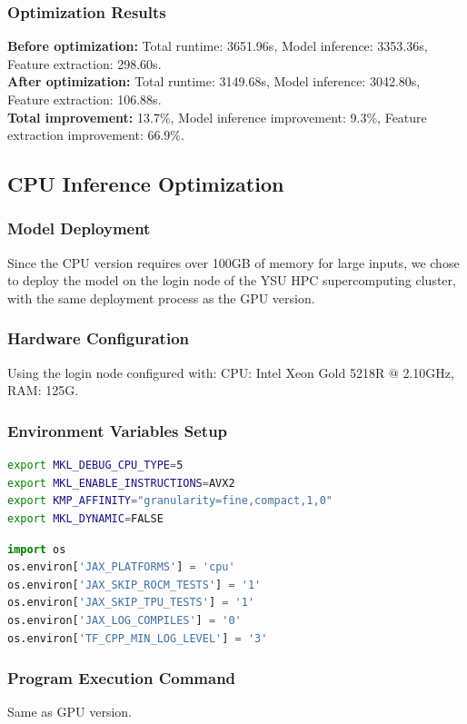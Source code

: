 \documentclass[a4paper,12pt]{article}
\begin{document}
\subsubsection{Optimization Results}
\textbf{Before optimization:} Total runtime: 3651.96s, Model inference: 3353.36s, Feature extraction: 298.60s. \\
\textbf{After optimization:} Total runtime: 3149.68s, Model inference: 3042.80s, Feature extraction: 106.88s. \\
\textbf{Total improvement:} 13.7\%, Model inference improvement: 9.3\%, Feature extraction improvement: 66.9\%.

\subsection{CPU Inference Optimization}

\subsubsection{Model Deployment}
Since the CPU version requires over 100GB of memory for large inputs, we chose to deploy the model on the login node of the YSU HPC supercomputing cluster, with the same deployment process as the GPU version.

\subsubsection{Hardware Configuration}
Using the login node configured with: CPU: Intel Xeon Gold 5218R @ 2.10GHz, RAM: 125G.

\subsubsection{Environment Variables Setup}
\begin{lstlisting}[language=bash]
export MKL_DEBUG_CPU_TYPE=5
export MKL_ENABLE_INSTRUCTIONS=AVX2
export KMP_AFFINITY="granularity=fine,compact,1,0"
export MKL_DYNAMIC=FALSE
\end{lstlisting}
\begin{lstlisting}[language=python]
import os
os.environ['JAX_PLATFORMS'] = 'cpu'
os.environ['JAX_SKIP_ROCM_TESTS'] = '1'
os.environ['JAX_SKIP_TPU_TESTS'] = '1'
os.environ['JAX_LOG_COMPILES'] = '0'
os.environ['TF_CPP_MIN_LOG_LEVEL'] = '3'
\end{lstlisting}

\subsubsection{Program Execution Command}
Same as GPU version.
\end{document}
